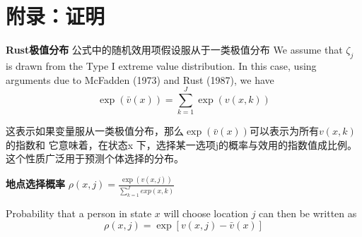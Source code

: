 \documentclass[10pt,a4paper]{article}
\begin{document}
\section{附录：证明} %
\label{sec:附录_证明}
\textbf{Rust极值分布}
公式中的随机效用项假设服从于一类极值分布
We assume that $\zeta_j$ is drawn from the Type I extreme value distribution. In this case, using arguments due to McFadden (1973) and Rust (1987), we have
$$\exp\left(\bar{v}(x)\right) = \sum_{k=1}^J \exp\left(v(x, k)\right)$$

这表示如果变量服从一类极值分布，那么$\exp\left(\bar{v}(x)\right)$可以表示为所有$v(x, k)$的指数和
它意味着，在状态x 下，选择某一选项j的概率与效用的指数值成比例。
这个性质广泛用于预测个体选择的分布。

\textbf{地点选择概率}
$\rho(x,j)=\frac{\exp(v(x,j))}{\sum\limits_{k=1}^{J} exp(x,k)}$

Probability that a person in state $x$ will choose location $j$ can then be written as
$$\rho(x,j)=\exp[v(x,j)-\bar v(x)]$$






\end{document}
